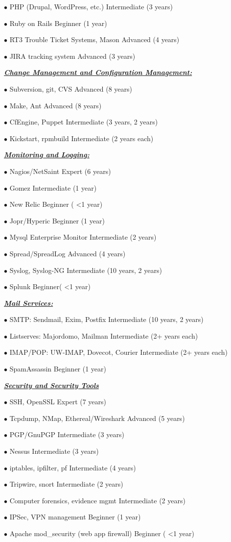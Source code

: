 \documentclass{article}
\newcommand{\skillset}[1]{{ \underline{\textbf{\emph{#1}}}\\  }}
\newcommand{\skill}[2]{{$\bullet$ #1 \hfill #2 }}
\begin{document}
\skill{PHP (Drupal, WordPress, etc.)}{Intermediate (3 years)}

\skill{Ruby on Rails}{Beginner (1 year)}

\skill{RT3 Trouble Ticket Systems, Mason}{Advanced (4 years)}

\skill{JIRA tracking system}{Advanced (3 years)}



\skillset{Change Management and Configuration Management: }

\skill{Subversion, git, CVS}{Advanced (8 years)}

\skill{Make, Ant}{Advanced (8 years)}

\skill{CfEngine, Puppet}{Intermediate (3 years, 2 years)}

\skill{Kickstart, rpmbuild}{Intermediate (2 years each)}



\skillset{Monitoring and Logging: }

\skill{Nagios/NetSaint}{Expert (6 years)}

\skill{Gomez}{Intermediate (1 year)}

\skill{New Relic}{Beginner ( \textless 1 year)}

\skill{Jopr/Hyperic}{Beginner (1 year)}

\skill{Mysql Enterprise Monitor}{Intermediate (2 years)}

\skill{Spread/SpreadLog}{Advanced (4 years)}

\skill{Syslog, Syslog-NG}{Intermediate (10 years, 2 years)}

\skill{Splunk}{Beginner( \textless 1 year)}



\skillset{Mail Services:}

\skill{SMTP: Sendmail, Exim, Postfix}{Intermediate (10 years, 2 years)}

\skill{Listserves: Majordomo, Mailman}{Intermediate (2+ years each)}

\skill{IMAP/POP: UW-IMAP, Dovecot, Courier}{Intermediate (2+ years each)}

\skill{SpamAssassin}{Beginner (1 year)}


\skillset{Security and Security Tools}

\skill{SSH, OpenSSL}{Expert (7 years)}

\skill{Tcpdump, NMap, Ethereal/Wireshark}{Advanced (5 years)}

\skill{PGP/GnuPGP}{Intermediate (3 years)}

\skill{Nessus}{Intermediate (3 years)}

\skill{iptables, ipfilter, pf}{Intermediate (4 years)}

\skill{Tripwire, snort}{Intermediate (2 years)}

\skill{Computer forensics, evidence mgmt}{Intermediate (2 years)}

\skill{IPSec, VPN management}{Beginner (1 year)}

\skill{Apache mod\_security (web app firewall)}{Beginner ( \textless 1 year)}
\end{document}
